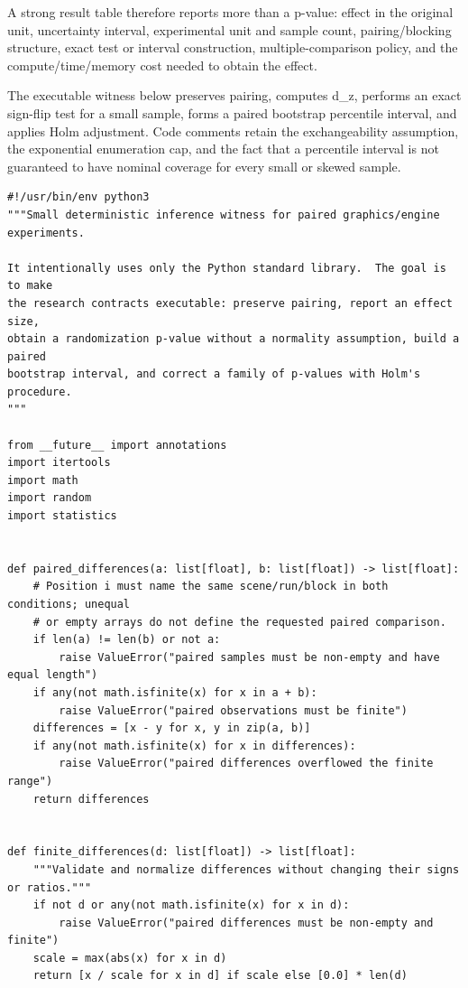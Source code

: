A strong result table therefore reports more than a p-value: effect in the original unit, uncertainty interval, experimental unit and sample count, pairing/blocking structure, exact test or interval construction, multiple-comparison policy, and the compute/time/memory cost needed to obtain the effect.

The executable witness below preserves pairing, computes d\_z, performs an exact sign-flip test for a small sample, forms a paired bootstrap percentile interval, and applies Holm adjustment. Code comments retain the exchangeability assumption, the exponential enumeration cap, and the fact that a percentile interval is not guaranteed to have nominal coverage for every small or skewed sample.

\begin{verbatim}
#!/usr/bin/env python3
"""Small deterministic inference witness for paired graphics/engine experiments.

It intentionally uses only the Python standard library.  The goal is to make
the research contracts executable: preserve pairing, report an effect size,
obtain a randomization p-value without a normality assumption, build a paired
bootstrap interval, and correct a family of p-values with Holm's procedure.
"""

from __future__ import annotations
import itertools
import math
import random
import statistics


def paired_differences(a: list[float], b: list[float]) -> list[float]:
    # Position i must name the same scene/run/block in both conditions; unequal
    # or empty arrays do not define the requested paired comparison.
    if len(a) != len(b) or not a:
        raise ValueError("paired samples must be non-empty and have equal length")
    if any(not math.isfinite(x) for x in a + b):
        raise ValueError("paired observations must be finite")
    differences = [x - y for x, y in zip(a, b)]
    if any(not math.isfinite(x) for x in differences):
        raise ValueError("paired differences overflowed the finite range")
    return differences


def finite_differences(d: list[float]) -> list[float]:
    """Validate and normalize differences without changing their signs or ratios."""
    if not d or any(not math.isfinite(x) for x in d):
        raise ValueError("paired differences must be non-empty and finite")
    scale = max(abs(x) for x in d)
    return [x / scale for x in d] if scale else [0.0] * len(d)



\end{verbatim}
